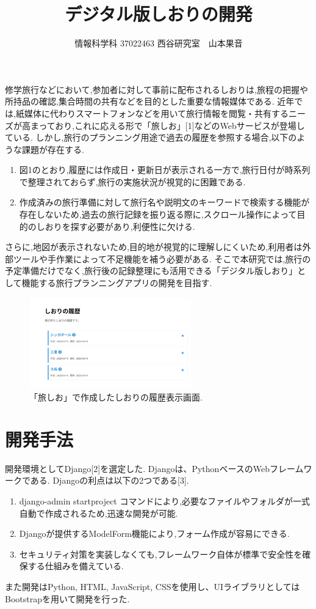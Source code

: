 \documentclass[a4j,twocolumn]{jsarticle}
\begin{document}
  \title{デジタル版しおりの開発}
  \author{情報科学科 \hspace{5mm} 37022463 \hspace{5mm} 西谷研究室　山本果音}
  \date{}

  \maketitle
修学旅行などにおいて,参加者に対して事前に配布されるしおりは,旅程の把握や所持品の確認,集合時間の共有などを目的とした重要な情報媒体である.
近年では,紙媒体に代わりスマートフォンなどを用いて旅行情報を閲覧・共有するニーズが高まっており,これに応える形で「旅しお」[1]などのWebサービスが登場している.
しかし,旅行のプランニング用途で過去の履歴を参照する場合,以下のような課題が存在する.
\begin{enumerate}
\item 図1のとおり,履歴には作成日・更新日が表示される一方で,旅行日付が時系列で整理されておらず,旅行の実施状況が視覚的に困難である.
\item 作成済みの旅行準備に対して旅行名や説明文のキーワードで検索する機能が存在しないため,過去の旅行記録を振り返る際に,スクロール操作によって目的のしおりを探す必要があり,利便性に欠ける.
\end{enumerate}
さらに,地図が表示されないため,目的地が視覚的に理解しにくいため,利用者は外部ツールや手作業によって不足機能を補う必要がある.
そこで本研究では,旅行の予定準備だけでなく,旅行後の記録整理にも活用できる「デジタル版しおり」として機能する旅行プランニングアプリの開発を目指す.



\begin{figure}[htbp]
\centering
\includegraphics[width=7cm]{./figs/rireki1.png}
\caption{\label{fig:org145026f}「旅しお」で作成したしおりの履歴表示画面.}
\end{figure}
\section{開発手法}
\label{sec:orgdda2658}
開発環境としてDjango[2]を選定した.
Djangoは、PythonベースのWebフレームワークである.
Djangoの利点は以下の2つである[3].
\begin{enumerate}
\item django-admin startproject コマンドにより,必要なファイルやフォルダが一式自動で作成されるため,迅速な開発が可能.
\item Djangoが提供するModelForm機能により,フォーム作成が容易にできる.
\item セキュリティ対策を実装しなくても,フレームワーク自体が標準で安全性を確保する仕組みを備えている.
\end{enumerate}
また開発はPython, HTML, JavaScript, CSSを使用し、UIライブラリとしてはBootstrapを用いて開発を行った.
\end{document}
